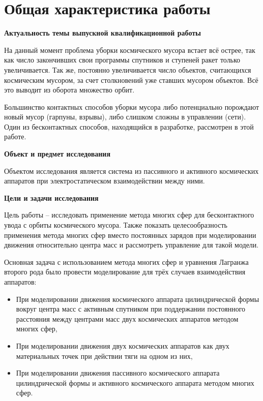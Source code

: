 \section*{Общая характеристика работы}
\textbf{Актуальность темы выпускной квалификационной работы}

На данный момент проблема уборки космического мусора встает всё острее, так как число закончивших свои программы спутников и ступеней ракет только увеличивается.
Так же, постоянно увеличивается число объектов, считающихся космическим мусором, за счет столкновений уже ставших мусором объектов.
Всё это выводит из оборота множество орбит.

Большинство контактных способов уборки мусора либо потенциально порождают новый мусор (гарпуны, взрывы), либо слишком сложны в управлении (сети).
Один из бесконтактных способов, находящийся в разработке, рассмотрен в этой работе.

\textbf{Объект и предмет исследования}

Объектом исследования является система из пассивного и активного космических аппаратов при электростатическом взаимодействии между ними.

\textbf{Цели и задачи исследования}

Цель работы – исследовать применение метода многих сфер  для бесконтактного увода с орбиты космического мусора.
Также показать целесообразность применения метода многих сфер вместо постоянных зарядов при моделировании движения относительно центра масс и рассмотреть управление для такой модели.

Основная задача с использованием метода многих сфер и уравнения Лагранжа второго рода было провести моделирование для трёх случаев взаимодействия аппаратов:
\begin{itemize}
	\item При моделировании движения космического аппарата цилиндрической формы вокруг центра масс с активным спутником при поддержании постоянного расстояния между центрами масс двух космических аппаратов методом многих сфер,
	\item При моделировании движения двух космических аппаратов как двух материальных точек при действии тяги на одном из них,
	\item При моделировании движения пассивного космического аппарата цилиндрической формы и активного космического аппарата методом многих сфер.
\end{itemize}